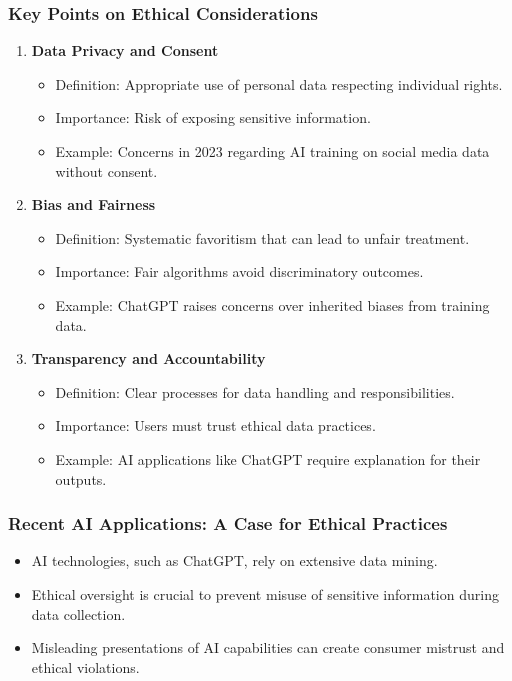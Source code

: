 \documentclass[aspectratio=169]{beamer}
\begin{document}
\begin{frame}[fragile]
    \frametitle{Key Points on Ethical Considerations}
    \begin{enumerate}
        \item \textbf{Data Privacy and Consent}
        \begin{itemize}
            \item Definition: Appropriate use of personal data respecting individual rights.
            \item Importance: Risk of exposing sensitive information.
            \item Example: Concerns in 2023 regarding AI training on social media data without consent.
        \end{itemize}
        
        \item \textbf{Bias and Fairness}
        \begin{itemize}
            \item Definition: Systematic favoritism that can lead to unfair treatment.
            \item Importance: Fair algorithms avoid discriminatory outcomes.
            \item Example: ChatGPT raises concerns over inherited biases from training data.
        \end{itemize}
        
        \item \textbf{Transparency and Accountability}
        \begin{itemize}
            \item Definition: Clear processes for data handling and responsibilities.
            \item Importance: Users must trust ethical data practices.
            \item Example: AI applications like ChatGPT require explanation for their outputs.
        \end{itemize}
    \end{enumerate}
\end{frame}

\begin{frame}[fragile]
    \frametitle{Recent AI Applications: A Case for Ethical Practices}
    \begin{itemize}
        \item AI technologies, such as ChatGPT, rely on extensive data mining.
        \item Ethical oversight is crucial to prevent misuse of sensitive information during data collection.
        \item Misleading presentations of AI capabilities can create consumer mistrust and ethical violations.
    \end{itemize}
\end{frame}
\end{document}
